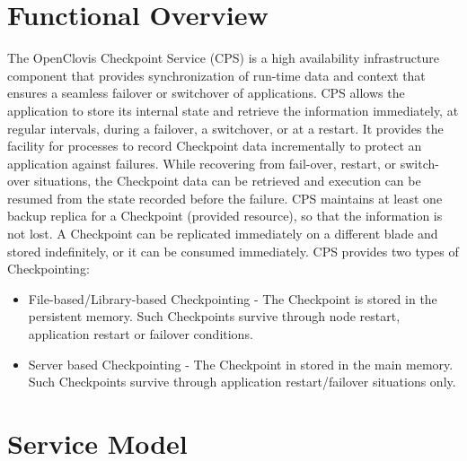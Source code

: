 
\hypertarget{group__group10}{
\chapter{Functional Overview}
\label{group__group10}
}

\begin{flushleft}
The OpenClovis Checkpoint Service (CPS) is a high availability infrastructure component that provides synchronization of 
run-time data and context that ensures a seamless failover or switchover of applications. 
CPS allows the application to store its internal state and retrieve the information immediately, at regular intervals, during a failover, 
a switchover, or at a restart. 
It provides the facility for processes to record Checkpoint data incrementally to protect an application against failures. While recovering from fail-over,
restart, or switch-over situations, the Checkpoint data can be retrieved and execution can be resumed from the state recorded before the failure. 
CPS maintains at least one backup replica for a Checkpoint (provided resource), so that the information is not lost. A Checkpoint can be 
replicated immediately on a different blade and stored indefinitely, or it can be consumed immediately. 
CPS provides two types of Checkpointing:
\begin{itemize}
\item
File-based/Library-based Checkpointing - The Checkpoint is stored in the persistent memory. Such Checkpoints survive through node restart, application
restart or failover conditions.
\item
Server based Checkpointing - The Checkpoint in stored in the main memory. Such Checkpoints survive through application restart/failover situations
only.
\end{itemize}

\chapter{Service Model}


\end{flushleft}
